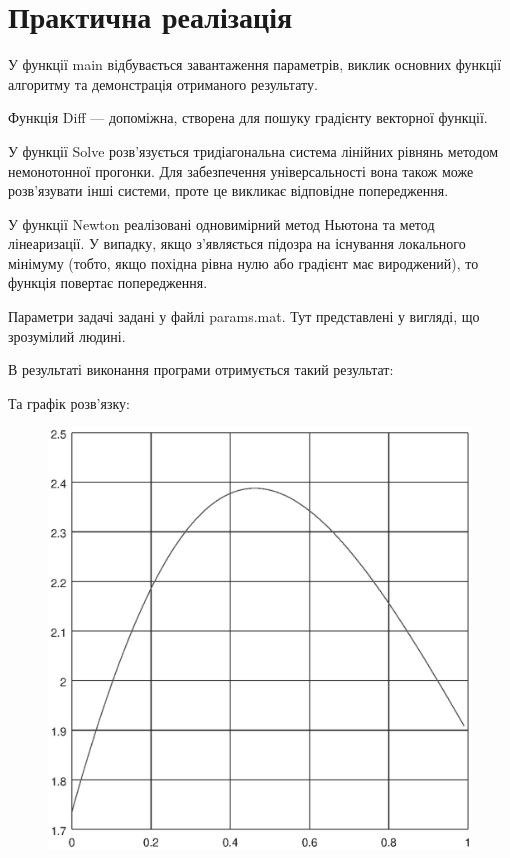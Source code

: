 \documentclass[titlepage]{article}
\begin{document}
\section{Практична реалізація}
У функції main відбувається завантаження параметрів, виклик основних функції алгоритму та демонстрація отриманого результату.

Функція Diff --- допоміжна, створена для пошуку градієнту векторної функції.

У функції Solve розв'язується тридіагональна система лінійних рівнянь методом немонотонної прогонки. Для забезпечення універсальності вона також може\\ розв'язувати інші системи, проте це викликає відповідне попередження.

У функції Newton реалізовані одновимірний метод Ньютона та метод лінеаризації. У випадку, якщо з'являється підозра на існування локального мінімуму (тобто, якщо похідна рівна нулю або градієнт має вироджений), то функція повертає попередження.

Параметри задачі задані у файлі params.mat. Тут представлені у вигляді, що зрозумілий людині.

\newpage
В результаті виконання програми отримується такий результат:

Та графік розв'язку:
\begin{figure}[h]
\hspace{-1.5cm}\includegraphics{result.eps}
\end{figure}
\end{document}
